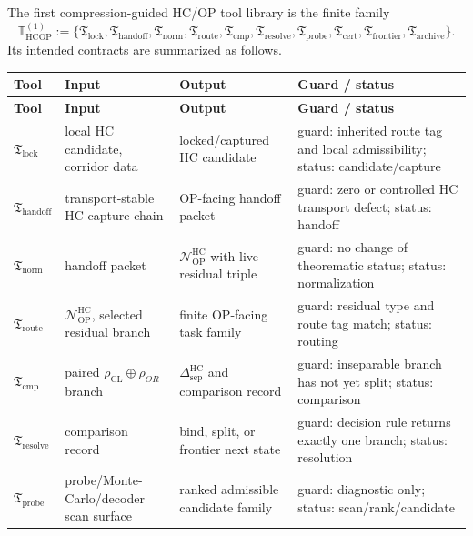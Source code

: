 \begin{definition}
\label{def:first-extracted-hcop-tool-library}
The first compression-guided HC/OP tool library is the finite family
\[
  \mathbb T_{\mathrm{HCOP}}^{(1)}
  :=
  \{
    \mathfrak T_{\mathrm{lock}},
    \mathfrak T_{\mathrm{handoff}},
    \mathfrak T_{\mathrm{norm}},
    \mathfrak T_{\mathrm{route}},
    \mathfrak T_{\mathrm{cmp}},
    \mathfrak T_{\mathrm{resolve}},
    \mathfrak T_{\mathrm{probe}},
    \mathfrak T_{\mathrm{cert}},
    \mathfrak T_{\mathrm{frontier}},
    \mathfrak T_{\mathrm{archive}}
  \}.
\]
Its intended contracts are summarized as follows.

{\small
\renewcommand{\arraystretch}{1.18}
\begin{longtable}{|p{}|p{}|p{}|p{}|}
\hline
\textbf{Tool} & \textbf{Input} & \textbf{Output} & \textbf{Guard / status} \\
\hline
\endfirsthead
\hline
\textbf{Tool} & \textbf{Input} & \textbf{Output} & \textbf{Guard / status} \\
\hline
\endhead
\(\mathfrak T_{\mathrm{lock}}\) & local HC candidate, corridor data & locked/captured HC candidate & guard: inherited route tag and local admissibility; status: candidate/capture \\
\hline
\(\mathfrak T_{\mathrm{handoff}}\) & transport-stable HC-capture chain & OP-facing handoff packet & guard: zero or controlled HC transport defect; status: handoff \\
\hline
\(\mathfrak T_{\mathrm{norm}}\) & handoff packet & \(\mathcal N_{\mathrm{OP}}^{\mathrm{HC}}\) with live residual triple & guard: no change of theorematic status; status: normalization \\
\hline
\(\mathfrak T_{\mathrm{route}}\) & \(\mathcal N_{\mathrm{OP}}^{\mathrm{HC}}\), selected residual branch & finite OP-facing task family & guard: residual type and route tag match; status: routing \\
\hline
\(\mathfrak T_{\mathrm{cmp}}\) & paired \(\rho_{\mathrm{CL}}\oplus\rho_{\Theta R}\) branch & \(\Delta_{\mathrm{sep}}^{\mathrm{HC}}\) and comparison record & guard: inseparable branch has not yet split; status: comparison \\
\hline
\(\mathfrak T_{\mathrm{resolve}}\) & comparison record & bind, split, or frontier next state & guard: decision rule returns exactly one branch; status: resolution \\
\hline
\(\mathfrak T_{\mathrm{probe}}\) & probe/Monte-Carlo/decoder scan surface & ranked admissible candidate family & guard: diagnostic only; status: scan/rank/candidate \\

\end{longtable}}
\end{definition}
